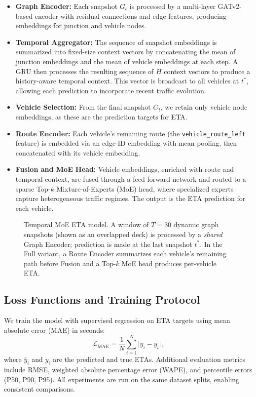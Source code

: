 \begin{itemize}
    \item \textbf{Graph Encoder:} Each snapshot $G_t$ is processed by a multi-layer GATv2-based encoder with residual connections and edge features, producing embeddings for junction and vehicle nodes.
    \item \textbf{Temporal Aggregator:} The sequence of snapshot embeddings is summarized into fixed-size context vectors by concatenating the mean of junction embeddings and the mean of vehicle embeddings at each step. A GRU then processes the resulting sequence of $H$ context vectors to produce a history-aware temporal context. This vector is broadcast to all vehicles at $t^*$, allowing each prediction to incorporate recent traffic evolution.
    \item \textbf{Vehicle Selection:} From the final snapshot $G_t$, we retain only vehicle node embeddings, as these are the prediction targets for ETA.
    \item \textbf{Route Encoder:} Each vehicle’s remaining route (the \texttt{vehicle\_route\_left} feature) is embedded via an edge-ID embedding with mean pooling, then concatenated with its vehicle embedding.
    \item \textbf{Fusion and MoE Head:} Vehicle embeddings, enriched with route and temporal context, are fused through a feed-forward network and routed to a sparse Top-$k$ Mixture-of-Experts (MoE) head, where specialized experts capture heterogeneous traffic regimes. The output is the ETA prediction for each vehicle.
\end{itemize}

\begin{figure}[t]
    \centering
    \resizebox{0.95\columnwidth}{!}{%
    }
    \caption{Temporal MoE ETA model. A window of $T{=}30$ dynamic graph snapshots (shown as an overlapped deck) is processed by a \emph{shared} Graph Encoder; prediction is made at the last snapshot $t^*$. In the Full variant, a Route Encoder summarizes each vehicle's remaining path before Fusion and a Top-$k$ MoE head produces per-vehicle ETA.}
    \label{fig:temporal-moe-eta}
\end{figure}
\subsection{Loss Functions and Training Protocol}
We train the model with supervised regression on ETA targets using mean absolute error (MAE) in seconds:
\[
\mathcal{L}_{\text{MAE}} = \frac{1}{N}\sum_{i=1}^N \big| \hat{y}_i - y_i \big|,
\]
where $\hat{y}_i$ and $y_i$ are the predicted and true ETAs. Additional evaluation metrics include RMSE, weighted absolute percentage error (WAPE), and percentile errors (P50, P90, P95). 
All experiments are run on the same dataset splits, enabling consistent comparisons.


